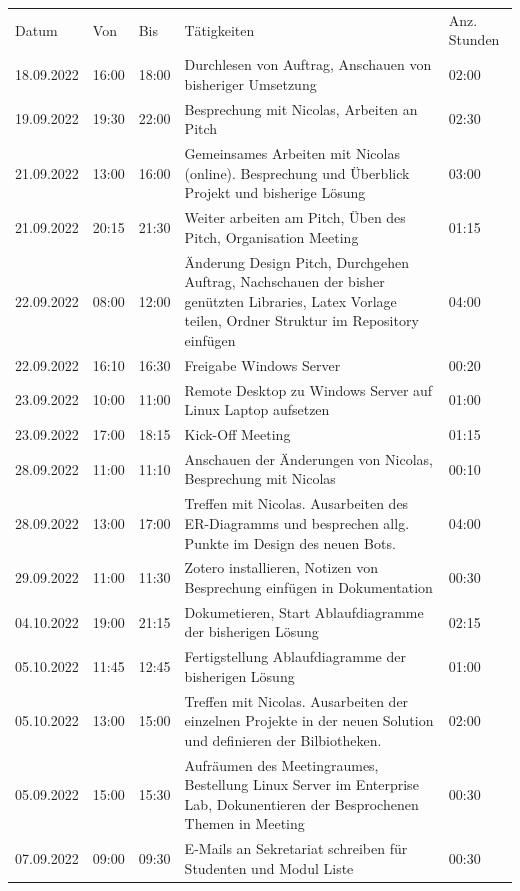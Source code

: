 \documentclass[a4paper, table]{article}
\begin{document}
\begin{longtable}[h]{|l|l|l|p{20em}|l|}
    \hline
    \rowcolor[gray]{.9} Datum & Von & Bis & Tätigkeiten & Anz. Stunden  \\
    18.09.2022 & 16:00 & 18:00 & Durchlesen von Auftrag, Anschauen von bisheriger   Umsetzung & 02:00 \\
    19.09.2022 & 19:30 & 22:00 & Besprechung mit Nicolas, Arbeiten an Pitch & 02:30 \\
    21.09.2022 & 13:00 & 16:00 & Gemeinsames Arbeiten mit Nicolas (online).   Besprechung und Überblick Projekt und bisherige Lösung & 03:00 \\
    21.09.2022 & 20:15 & 21:30 & Weiter arbeiten am Pitch, Üben des Pitch,   Organisation Meeting & 01:15 \\
    22.09.2022 & 08:00 & 12:00 & Änderung Design Pitch, Durchgehen Auftrag,   Nachschauen der bisher genützten Libraries, Latex Vorlage teilen, Ordner   Struktur im Repository einfügen & 04:00 \\
    22.09.2022 & 16:10 & 16:30 & Freigabe Windows Server & 00:20 \\
    23.09.2022 & 10:00 & 11:00 & Remote Desktop zu Windows Server auf Linux Laptop   aufsetzen & 01:00 \\
    23.09.2022 & 17:00 & 18:15 & Kick-Off Meeting & 01:15 \\
    28.09.2022 & 11:00 & 11:10 & Anschauen der Änderungen von Nicolas, Besprechung   mit Nicolas & 00:10 \\
    28.09.2022 & 13:00 & 17:00 & Treffen mit Nicolas. Ausarbeiten des ER-Diagramms   und besprechen allg. Punkte im Design des neuen Bots. & 04:00 \\
    29.09.2022 & 11:00 & 11:30 & Zotero installieren, Notizen von Besprechung   einfügen in Dokumentation & 00:30 \\
    04.10.2022 & 19:00 & 21:15 & Dokumetieren, Start Ablaufdiagramme der   bisherigen Lösung & 02:15 \\
    05.10.2022 & 11:45 & 12:45 & Fertigstellung Ablaufdiagramme der bisherigen   Lösung & 01:00 \\
    05.10.2022 & 13:00 & 15:00 & Treffen mit Nicolas. Ausarbeiten der einzelnen   Projekte in der neuen Solution und definieren der Bilbiotheken. & 02:00 \\
    05.09.2022 & 15:00 & 15:30 & Aufräumen des Meetingraumes, Bestellung Linux   Server im Enterprise Lab, Dokunentieren der Besprochenen Themen in Meeting & 00:30 \\
    07.09.2022 & 09:00 & 09:30 & E-Mails an Sekretariat schreiben für Studenten   und Modul Liste & 00:30 \\

\end{longtable}
\end{document}
